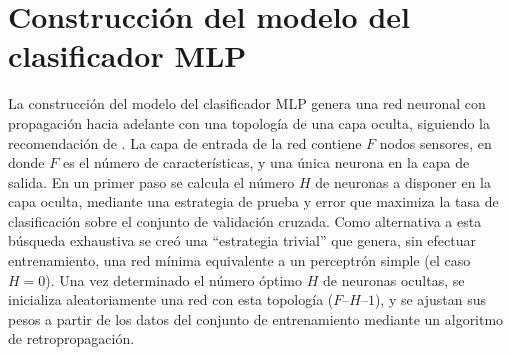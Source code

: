 %
%
%
\section{Construcción del modelo del clasificador MLP}
%
La construcción del modelo del clasificador MLP genera una red
neuronal con propagación hacia adelante con una topología de una
capa oculta, siguiendo la recomendación de \cite{nnfaq}.
La capa de entrada de la red contiene $F$ nodos sensores, en donde $F$
es el número de características, y una única neurona en la capa de
salida.
En un primer paso se calcula el número $H$ de neuronas a disponer en
la capa oculta, mediante una estrategia de prueba y error que maximiza
la tasa de clasificación sobre el conjunto de validación cruzada.
Como alternativa a esta búsqueda exhaustiva se creó una ``estrategia
trivial'' que genera, sin efectuar entrenamiento, una red mínima
equivalente a un perceptrón simple (el caso $H=0$).
Una vez determinado el número óptimo $H$ de neuronas ocultas, se
inicializa aleatoriamente una red con esta topología ($F$--$H$--$1$),
y se ajustan sus pesos a partir de los datos del conjunto de
entrenamiento mediante un algoritmo de retropropagación.
